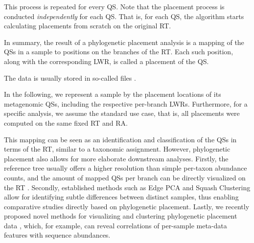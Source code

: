 This process is repeated for every \ac{QS}.
Note that the placement process is conducted {\em independently} for each \ac{QS}.
That is, for each \ac{QS}, the algorithm starts calculating placements from scratch on the original \ac{RT}.

In summary, the result of a phylogenetic placement analysis is a mapping of the \acp{QS} in a sample
to positions on the branches of the \ac{RT}.
Each such position, along with the corresponding \ac{LWR}, is called a placement of the \ac{QS}.

The data is usually stored in so-called  files \cite{Matsen2012}.

In the following, we represent a sample by the placement locations of its metagenomic \acp{QS},
including the respective per-branch \acp{LWR}.
Furthermore, for a specific analysis, we assume the standard use case,
that is, all placements were computed on the same fixed \acf{RT} and \acl{RA}.


This mapping can be seen as an identification and classification of the \acp{QS} in terms of the \ac{RT},
similar to a taxonomic assignment.
However, phylogenetic placement also allows for more elaborate downstream analyses.
Firstly, the reference tree usually offers a higher resolution than simple per-taxon abundance counts,
and the amount of mapped \acp{QS} per branch can be directly visualized on the \ac{RT} \citep{Mahe2017}.
Secondly, established methods such as Edge PCA and Squash Clustering \citep{Matsen2011a}
allow for identifying subtle differences between distinct samples,
thus enabling comparative studies directly based on phylogenetic placement.
Lastly, we recently proposed novel methods for visualizing and clustering phylogenetic placement data \citep{Czech2018a},
which, for example, can reveal correlations of per-sample meta-data features with sequence abundances.


